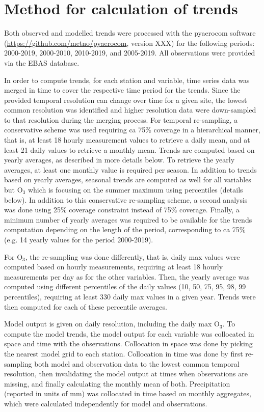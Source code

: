 \section{\label{Method}{Method for calculation of trends}}
Both observed and modelled trends were processed with the pyaerocom software (\url{https://github.com/metno/pyaerocom}, version XXX) for the following periods: 2000-2019, 2000-2010, 2010-2019, and 2005-2019. All observations were provided via the EBAS database. 

In order to compute trends, for each station and variable, time series data was merged in time to cover the respective time period for the trends.
Since the provided temporal resolution can change over time for a given site, the lowest common resolution was identified and higher resolution data were down-sampled to that resolution during the merging process. For temporal re-sampling, a conservative scheme was used requiring ca 75\% coverage in a hierarchical manner, that is, at least 18 hourly measurement values to retrieve a daily mean, and at least 21 daily values to retrieve a monthly mean. Trends are computed based on yearly averages, as described in more details below. To retrieve the yearly averages, at least one monthly value is required per season. In addition to trends based on yearly averages, seasonal trends are computed as well for all variables but O$_{3}$ which is focusing on the summer maximum using percentiles (details below). In addition to this conservative re-sampling scheme, a second analysis was done using 25\% coverage constraint instead of 75\% coverage. Finally, a minimum number of yearly averages was required to be available for the trends computation depending on the length of the period, corresponding to ca 75\% (e.g. 14 yearly values for the period 2000-2019).

For O$_3$, the re-sampling was done differently, that is, daily max values were computed based on hourly measurements, requiring at least 18 hourly measurements per day as for the other variables. Then, the yearly average was computed using different percentiles of the daily values (10, 50, 75, 95, 98, 99 percentiles), requiring at least 330 daily max values in a given year. Trends were then computed for each of these percentile averages.

Model output is given on daily resolution, including the daily max O$_3$. To compute the model trends, the model output for each variable was collocated in space and time with the observations. Collocation in space was done by picking the nearest model grid to each station. Collocation in time was done by first re-sampling both model and observation data to the lowest common temporal resolution, then invalidating the model output at times when observations are missing, and finally calculating the monthly mean of both. Precipitation (reported in units of mm) was collocated in time based on monthly aggregates, which were calculated independently for model and observations.

